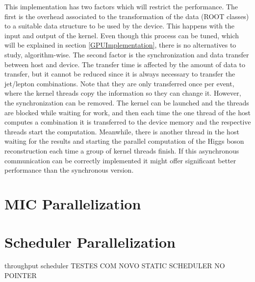 This implementation has two factors which will restrict the performance. The first is the overhead associated to the transformation of the data (ROOT classes) to a suitable data structure to be used by the device. This happens with the input and output of the kernel. Even though this process can be tuned, which will be explained in section \ref{GPUImplementation}, there is no alternatives to study, algorithm-wise. The second factor is the synchronization and data transfer between host and device. The transfer time is affected by the amount of data to transfer, but it cannot be reduced since it is always necessary to transfer the jet/lepton combinations. Note that they are only transferred once per event, where the kernel threads copy the information so they can change it. However, the synchronization can be removed. The kernel can be launched and the threads are blocked while waiting for work, and then each time the one thread of the host computes a combination it is transferred to the device memory and the respective threads start the computation. Meanwhile, there is another thread in the host waiting for the results and starting the parallel computation of the Higgs boson reconstruction each time a group of kernel threads finish. If this asynchronous communication can be correctly implemented it might offer significant better performance than the synchronous version.

\section{MIC Parallelization}
\label{Parallelization:MIC}

\section{Scheduler Parallelization}
\label{Parallelization:Scheduler}
throughput scheduler
TESTES COM NOVO STATIC SCHEDULER NO POINTER